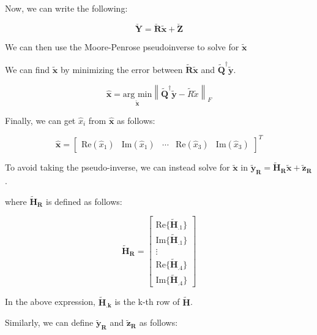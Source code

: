 \documentclass[fleqn]{article}
\newcommand{\norm}[1]{\left \lVert #1 \right \rVert}
\begin{document}
\begin{enumerate}
\begin{enumerate}
			Now, we can write the following:
		
			\begin{equation*}
				\mathbf{\breve{Y}} = \mathbf{\breve{R}}\mathbf{\tilde{x}} + \mathbf{\breve{Z}}
			\end{equation*}
		
			We can then use the Moore-Penrose pseudoinverse to solve for $\mathbf{\tilde{x}}$
			
			We can find $\mathbf{\tilde{x}}$ by minimizing the error between $\mathbf{\tilde{R}\tilde{x}}$ and $\mathbf{\tilde{Q}^{\dagger}\tilde{y}}$.
		
			\begin{equation*}
				\mathbf{\hat{x}} = \underset{\mathbf{\tilde{x}}}{\text{arg min}}{\norm{\mathbf{\tilde{Q}^{\dagger}\tilde{y}} - \tilde{R}\tilde{x}}_F}
			\end{equation*}
		
			Finally, we can get $\hat{x}_i$ from $\mathbf{\hat{x}}$ as follows:
		
			\begin{equation*}
				\mathbf{\hat{x}} = \begin{bmatrix}\text{Re}(\hat{x}_1) & \text{Im}(\hat{x}_1) & \cdots & \text{Re}(\hat{x}_3) & \text{Im}(\hat{x}_3)\end{bmatrix}^T
			\end{equation*}
		
			To avoid taking the pseudo-inverse, we can instead solve for $\mathbf{\tilde{x}}$ in $\mathbf{\tilde{y}_R} = \mathbf{\tilde{H}_R}\mathbf{\tilde{x}} + \mathbf{\tilde{z}_R}$.
			
			where $\mathbf{\tilde{H}_R}$ is defined as follows:
			
			\begin{equation*}
				\mathbf{\tilde{H}_R} = \begin{bmatrix}
					\text{Re}\{\mathbf{\tilde{H}_{.1}}\} \\
					\text{Im}\{\mathbf{\tilde{H}_{.1}}\} \\
					\vdots \\
					\text{Re}\{\mathbf{\tilde{H}_{.4}}\} \\
					\text{Im}\{\mathbf{\tilde{H}_{.4}}\}
				\end{bmatrix}
			\end{equation*}
			
			In the above expression, $\mathbf{\tilde{H}_{.k}}$ is the k-th row of $\mathbf{\tilde{H}}$.
			
			Similarly, we can define $\mathbf{\tilde{y}_R}$ and $\mathbf{\tilde{z}_R}$ as follows:
			

\end{enumerate}
\end{enumerate}
\end{document}
